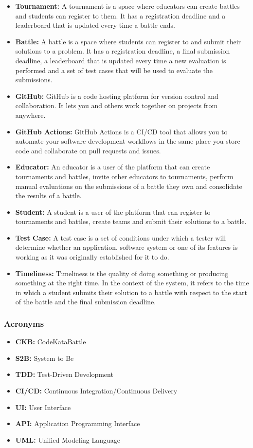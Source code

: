 \documentclass{article}
\begin{document}
\begin{itemize}
    \item \textbf{Tournament:} A tournament is a space where educators can create battles and students can register to them. It has a registration deadline and a leaderboard that is updated every time a battle ends.
    \item \textbf{Battle:} A battle is a space where students can register to and submit their solutions to a problem. It has a registration deadline, a final submission deadline, a leaderboard that is updated every time a new evaluation is performed and a set of test cases that will be used to evaluate the submissions.
    \item \textbf{GitHub:} GitHub is a code hosting platform for version control and collaboration. It lets you and others work together on projects from anywhere.
    \item \textbf{GitHub Actions:} GitHub Actions is a CI/CD tool that allows you to automate your software development workflows in the same place you store code and collaborate on pull requests and issues.
    \item \textbf{Educator:} An educator is a user of the platform that can create tournaments and battles, invite other educators to tournaments, perform manual evaluations on the submissions of a battle they own and consolidate the results of a battle.
    \item \textbf{Student:} A student is a user of the platform that can register to tournaments and battles, create teams and submit their solutions to a battle.
    \item \textbf{Test Case:} A test case is a set of conditions under which a tester will determine whether an application, software system or one of its features is working as it was originally established for it to do.
    \item \textbf{Timeliness:} Timeliness is the quality of doing something or producing something at the right time. In the context of the system, it refers to the time in which a student submits their solution to a battle with respect to the start of the battle and the final submission deadline.
\end{itemize}

\subsubsection{Acronyms}

\begin{itemize}
    \item \textbf{CKB:} CodeKataBattle
    \item \textbf{S2B:} System to Be
    \item \textbf{TDD:} Test-Driven Development
    \item \textbf{CI/CD:} Continuous Integration/Continuous Delivery
    \item \textbf{UI:} User Interface
    \item \textbf{API:} Application Programming Interface
    \item \textbf{UML:} Unified Modeling Language
\end{itemize}
\end{document}
